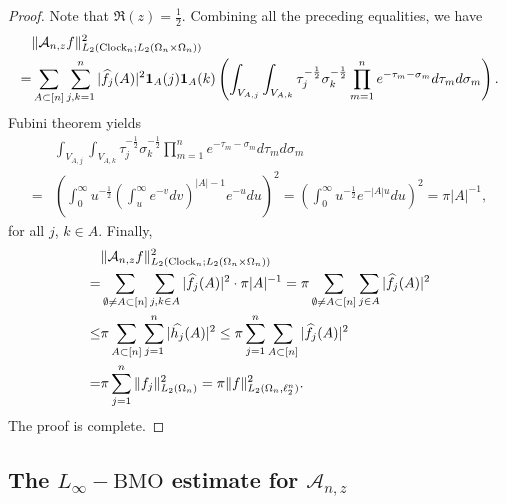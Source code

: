 \documentclass{amsart}
\numberwithin{equation}{section}
\theoremstyle{definition}
\theoremstyle{remark}
\newcommand{\1}{\mathbf 1}
\begin{document}
\begin{proof}
Note that $\Re(z)=\frac12$. Combining all the preceding equalities, we have
\begin{align*}
&\|\mathcal{A}_{n,z}f\|_{L_2({\rm Clock}_n;L_2(\Omega_n\times\Omega_n))}^2\\
=&\sum_{A\subset [n]} \sum_{j,k=1}^n|\widehat{f_j}(A)|^2\1_A(j)\1_A(k)\left(\int_{V_{A,j}}\int_{V_{A,k}}\tau_j^{-\frac12}\sigma_k^{-\frac12}\prod_{m=1}^ne^{-\tau_m-\sigma_m}d\tau_md\sigma_m\right).
\end{align*}
Fubini theorem yields
\begin{align*}
&\int_{V_{A,j}}\int_{V_{A,k}}\tau_j^{-\frac12}\sigma_k^{-\frac12}\prod_{m=1}^ne^{-\tau_m-\sigma_m}d\tau_md\sigma_m\\
=&\left(\int_0^{\infty}u^{-\frac12}\left(\int_u^{\infty}e^{-v}dv\right)^{|A|-1}e^{-u}du\right)^2=\left(\int_0^{\infty}u^{-\frac12}e^{-|A|u}du\right)^2=\pi|A|^{-1},
\end{align*}
for all $j$, $k\in A$. Finally,
\begin{align*}
&\|\mathcal{A}_{n,z}f\|_{L_2({\rm Clock}_n;L_2(\Omega_n\times\Omega_n))}^2\\
=&\sum_{\emptyset \neq A \subset [n]}\sum_{j,k\in A}|\widehat{f_j}(A)|^2\cdot \pi|A|^{-1}=\pi\sum_{\emptyset \neq A \subset [n]}\sum_{j\in A}|\widehat{f_j}(A)|^2\\
 \leq&\pi\sum_{A\subset [n]}\sum_{j=1}^n|\widehat{h_j}(A)|^2\leq\pi\sum_{j=1}^n\sum_{A\subset [n]} |\widehat{f_j}(A)|^2\\
=&\pi\sum_{j=1}^n\|f_j\|_{L_2(\Omega_n)}^2=\pi\|f\|_{L_2(\Omega_n,\ell^{n}_{2})}^2.
\end{align*}
The proof is complete.
\end{proof}

\subsection{The  $L_{\infty}-\mathrm{BMO}$ estimate for  $\mathcal{A}_{n,z}$ }\label{sec:right}
\end{document}

